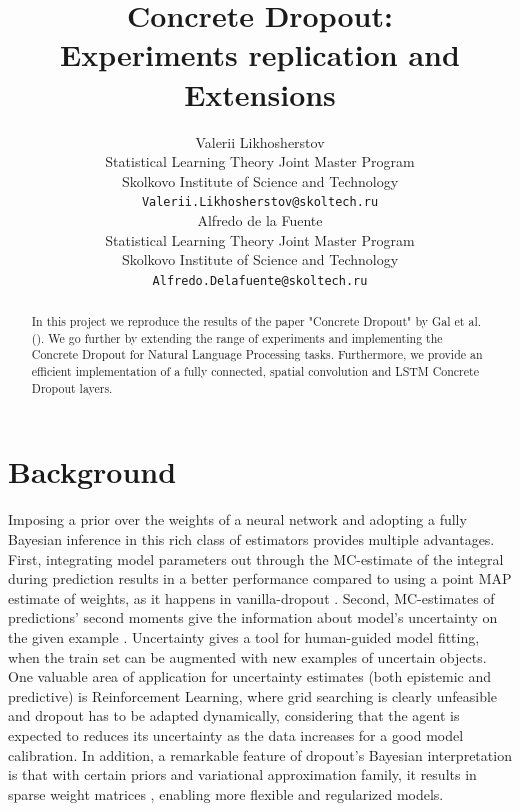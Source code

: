 \documentclass{article}
\title{Concrete Dropout: \\Experiments replication and Extensions}
\author{
  Valerii Likhosherstov \\
  Statistical Learning Theory Joint Master Program \\
  Skolkovo Institute of Science and Technology\\
  \texttt{Valerii.Likhosherstov@skoltech.ru} \\
   \And
 Alfredo de la Fuente \\
 Statistical Learning Theory Joint Master Program\\
 Skolkovo Institute of Science and Technology\\
  \texttt{Alfredo.Delafuente@skoltech.ru} \\
}
\begin{document}
\maketitle

\begin{abstract}
In this project we reproduce the results of the paper "Concrete Dropout" by Gal et al. (\cite{concrete}). We go further by extending the range of experiments and implementing the Concrete Dropout for Natural Language Processing tasks. Furthermore, we provide an efficient implementation of a fully connected, spatial convolution and LSTM Concrete Dropout layers.
\end{abstract}




\section{Background}

Imposing a prior over the weights of a neural network and adopting a fully Bayesian inference in this rich class of estimators provides multiple advantages. First, integrating model parameters out through the MC-estimate of the integral during prediction results in a better performance \cite{bconvnn} compared to using a point MAP estimate of weights, as it happens in vanilla-dropout \cite{dropout}. Second, MC-estimates of predictions' second moments give the information about model's uncertainty on the given example \cite{uncertainty}. Uncertainty gives a tool for human-guided model fitting, when the train set can be augmented with new examples of uncertain objects. One valuable area of application for uncertainty estimates (both epistemic and predictive) is Reinforcement Learning, where grid searching is clearly unfeasible and dropout has to be adapted dynamically, considering that the agent is expected to reduces its uncertainty as the data increases for a good model calibration. In addition, a remarkable feature of dropout's Bayesian interpretation is that with certain priors and variational approximation family, it results in sparse weight matrices \cite{sparse}, enabling more flexible and regularized models. \\
\end{document}
